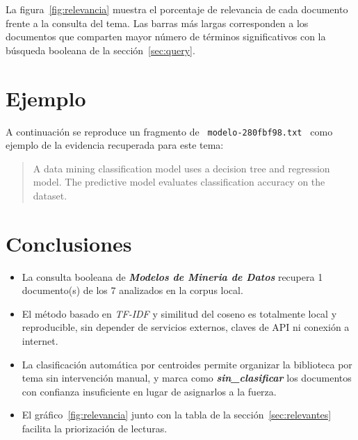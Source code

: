 \documentclass[11pt,a4paper]{article}
\newcommand{\tema}[1]{\textbf{\textit{#1}}}
\newcommand{\nombrearchivo}[1]{\texttt{#1}}
\begin{document}
La figura~\ref{fig:relevancia} muestra el porcentaje de relevancia de cada
documento frente a la consulta del tema. Las barras más largas corresponden a
los documentos que comparten mayor número de términos significativos con la
búsqueda booleana de la sección~\ref{sec:query}.


\section{Ejemplo}
\label{sec:ejemplo}

A continuación se reproduce un fragmento de
\nombrearchivo{ modelo-280fbf98.txt } como ejemplo de la evidencia
recuperada para este tema:

\begin{quote}
\small
A data mining classification model uses a decision tree and regression model. The predictive model evaluates classification accuracy on the dataset.
\end{quote}


\section{Conclusiones}
\label{sec:conclusiones}

\begin{itemize}
\setlength{\itemsep}{4pt}
  \item La consulta booleana de \tema{ Modelos de Mineria de Datos } recupera
        1 documento(s) de los 7
        analizados en la corpus local.
  \item El método basado en \textit{TF-IDF} y similitud del coseno es
        totalmente local y reproducible, sin depender de servicios externos,
        claves de API ni conexión a internet.
  \item La clasificación automática por centroides permite organizar la
        biblioteca por tema sin intervención manual, y marca como
        \tema{sin\_clasificar} los documentos con confianza insuficiente en
        lugar de asignarlos a la fuerza.
  \item El gráfico~\ref{fig:relevancia} junto con la tabla de la
        sección~\ref{sec:relevantes} facilita la priorización de lecturas.
\end{itemize}
\end{document}
